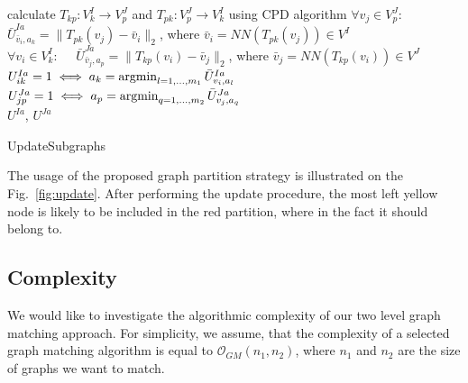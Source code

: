 \begin{algorithm}[h]
	{
		calculate $T_{kp}:V^I_k\rightarrow V^J_p$ and $T_{pk}:V^J_p\rightarrow V^I_k$ using CPD algorithm
	}
	{
		$\forall v_j\in V^J_p:\quad$ $\bar{U}^{Ia}_{\bar{v}_i,a_k}=\|T_{pk}(v_j)-\bar{v}_i\|_2$, where $\bar{v}_i=NN(T_{pk}(v_j))\in V^I$\\
		$\forall v_i\in V^I_k:\quad$ $\bar{U}^{Ja}_{\bar{v}_j,a_p}=\|T_{kp}(v_i)-\bar{v}_j\|_2$, where $\bar{v}_j=NN(T_{kp}(v_i))\in V^J$
	}
	$U^{Ia}_{ik}=1 \iff a_k=\mathop{\rm argmin}_{l=1,\dots,m_1}^{}{\bar{U}^{Ia}_{v_i,a_l}}$\\
	$U^{Ja}_{jp}=1 \iff a_p=\mathop{\rm argmin}_{q=1,\dots,m_2}^{}{\bar{U}^{Ja}_{v_j,a_q}}$\\
	\Return $U^{Ia}$, $U^{Ja}$
	
	\caption{UpdateSubgraphs}    \label{alg:update_subgraphs4.3.2}
\end{algorithm}

The usage of the proposed graph partition strategy is illustrated on the Fig.~\ref{fig:update}. After performing the update procedure, the most left yellow node is likely to be included in the red partition, where in the fact it should belong to.
\FloatBarrier
\subsection{Complexity}
We would like to investigate the algorithmic complexity of our two level graph matching approach. For simplicity, we assume, that the complexity of a selected graph matching algorithm is equal to $\mathcal{O}_{GM}(n_1,n_2)$, where $n_1$ and $n_2$ are the size of graphs we want to match.

